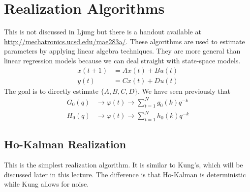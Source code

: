 \documentclass[lecture,12pt,]{pcms-l}
\theoremstyle{example}
\newcommand{\vp}{\varphi}
\newcommand{\sumt}{\sum_{t=1}^N}
\begin{document}
\section{Realization Algorithms}
This is not discussed in Ljung but there is a handout available at \\
\href{http://mechatronics.ucsd.edu/mae283a/}{http://mechatronics.ucsd.edu/mae283a/}. These algorithms are used to estimate parameters by applying linear algebra techniques. They are more general than linear regression models because we can deal straight with state-space models.
\begin{align*}
x(t+1) &= Ax(t)+Bu(t) \\
y(t) &= Cx(t)+Du(t)
\end{align*}
The goal is to directly estimate $\{A,B,C,D\}$. We have seen previously that
\begin{align*}
G_0(q) &\to \vp(t) \to \sumt g_0(k)q^{-k} \\
H_0(q) &\to \vp(t) \to \sumt h_0(k)q^{-k}
\end{align*}

\subsection{Ho-Kalman Realization}
This is the simplest realization algorithm. It is similar to Kung's, which will be discussed later in this lecture. The difference is that Ho-Kalman is deterministic while Kung allows for noise.
\end{document}

